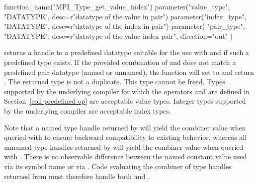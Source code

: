 \begin{mpi-binding}
    function_name("MPI_Type_get_value_index")
    parameter("value_type", "DATATYPE", desc=r"datatype of the value in pair")
    parameter("index_type", "DATATYPE", desc=r"datatype of the index in pair")
    parameter(
        "pair_type",
        "DATATYPE",
        desc=r"datatype of the value-index pair",
        direction="out"
    )
\end{mpi-binding}

 returns a handle to a predefined datatype suitable for the use with  and  if such a predefined type exists.
If the provided combination of  and  does not match a predefined pair datatype (named or unnamed), the function will set  to  and return .
The returned type is not a duplicate.
This type cannot be freed.
Types supported by the underlying compiler for which the operators  and  are defined in Section~\ref{coll-predefined-op} are acceptable value types.
Integer types supported by the underlying compiler are acceptable index types.

\begin{sloppy}
\begin{users}
    Note that a named type handle returned by  will yield the combiner value  when queried with  to ensure backward compatibility to existing behavior, whereas all unnamed type handles returned by  will yield the combiner value  when queried with .
    There is no observable difference between the named constant value used via its symbol name or via .
    Code evaluating the combiner of type handles returned from  must therefore handle both  and .
\end{users}
\end{sloppy}

